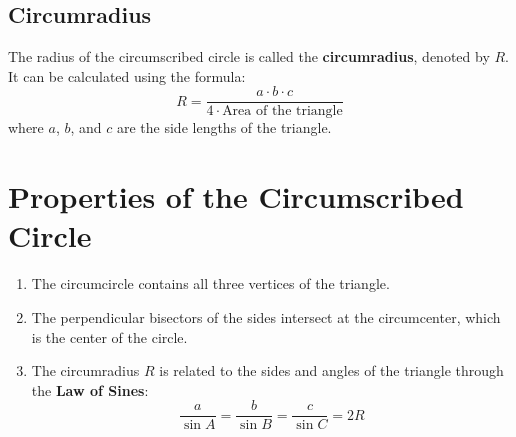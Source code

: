 \documentclass[12pt,a4paper]{article}
\begin{document}
\subsection*{Circumradius}
The radius of the circumscribed circle is called the \textbf{circumradius}, denoted by \( R \). It can be calculated using the formula:
\[
R = \frac{a \cdot b \cdot c}{4 \cdot \text{Area of the triangle}}
\]
where \( a \), \( b \), and \( c \) are the side lengths of the triangle.

\section*{Properties of the Circumscribed Circle}

\begin{enumerate}
    \item The circumcircle contains all three vertices of the triangle.
    \item The perpendicular bisectors of the sides intersect at the circumcenter, which is the center of the circle.
    \item The circumradius \( R \) is related to the sides and angles of the triangle through the \textbf{Law of Sines}:
\[
\frac{a}{\sin A} = \frac{b}{\sin B} = \frac{c}{\sin C} = 2R
\]
\end{enumerate}
\end{document}

